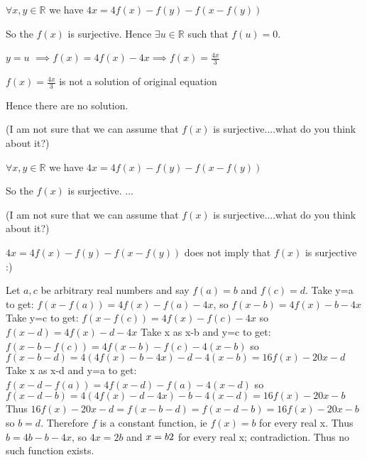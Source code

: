 \begin{solution}
	$ \forall x,y \in \mathbb{R}$ we have $ 4x = 4f(x)-f(y)-f(x-f(y))$

So the $ f(x)$ is surjective. Hence $ \exists u \in \mathbb{R}$ such that $ f(u)=0$.

$ y=u$ $ \implies f(x)=4f(x)-4x \implies f(x)=\frac{4x}3$

$ f(x)=\frac{4x}3$ is not a solution of original equation

\begin{bolded}Hence there are no solution.\end{bolded} 

\begin{italicized}(I am not sure that we can assume that $ f(x)$ is surjective....what do you think about it?)\end{italicized}
\end{solution}



\begin{solution}
	\begin{tcolorbox}$ \forall x,y \in \mathbb{R}$ we have $ 4x = 4f(x) - f(y) - f(x - f(y))$

So the $ f(x)$ is surjective. ...

\begin{italicized}(I am not sure that we can assume that $ f(x)$ is surjective....what do you think about it?)\end{italicized}\end{tcolorbox}

$ 4x = 4f(x) - f(y) - f(x - f(y))$ does not imply that $ f(x)$ is surjective  :)
\end{solution}



\begin{solution}
	Let $ a,c$ be arbitrary real numbers and say $ f(a)=b$ and $ f(c)=d$. Take y=a to get:
$ f(x-f(a))=4f(x)-f(a)-4x$, so $ f(x-b)=4f(x)-b-4x$
Take y=c to get:
$ f(x-f(c))=4f(x)-f(c)-4x$ so $ f(x-d)=4f(x)-d-4x$
Take x as x-b and y=c to get:
$ f(x-b-f(c))=4f(x-b)-f(c)-4(x-b)$ so $ f(x-b-d)=4(4f(x)-b-4x)-d-4(x-b)=16f(x)-20x-d$ 
Take x as x-d and y=a to get:
$ f(x-d-f(a))=4f(x-d)-f(a)-4(x-d)$ so $ f(x-d-b)=4(4f(x)-d-4x)-b-4(x-d)=16f(x)-20x-b$ 
Thus
$ 16f(x)-20x-d=f(x-b-d)=f(x-d-b)=16f(x)-20x-b$ so $ b=d$.
Therefore $ f$ is a constant function, ie $ f(x)=b$ for every real x. Thus $ b=4b-b-4x$, so $ 4x=2b$ and $ x=b\/2$ for every real x; contradiction. Thus no such function exists.
\end{solution}



